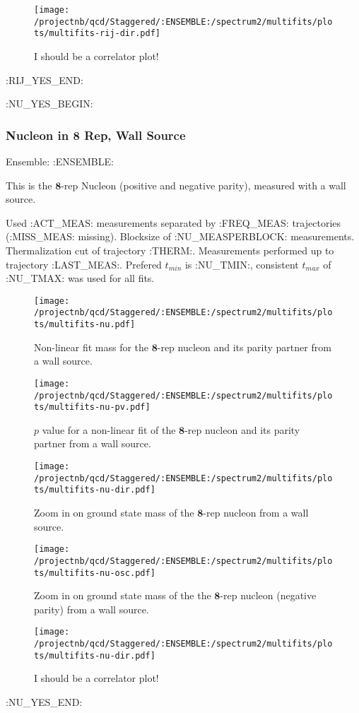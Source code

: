 \begin{figure}[H]
\centering
\texttt{[image: /projectnb/qcd/Staggered/:ENSEMBLE:/spectrum2/multifits/plots/multifits-rij-dir.pdf]}
\caption{I should be a correlator plot!}
\end{figure}

\clearpage
:RIJ_YES_END:

:NU_YES_BEGIN:
\subsubsection{Nucleon in $\mathbf{8}$ Rep, Wall Source}

Ensemble: :ENSEMBLE:

This is the $\mathbf{8}$-rep Nucleon (positive and negative parity), measured with a wall source.

{\small{Used :ACT_MEAS: measurements separated by :FREQ_MEAS: trajectories (:MISS_MEAS: missing). Blocksize of :NU_MEASPERBLOCK: measurements. Thermalization cut of trajectory :THERM:. Measurements performed up to trajectory :LAST_MEAS:. Prefered $t_{min}$ is :NU_TMIN:, consistent $t_{max}$ of :NU_TMAX: was used for all fits.}}

\begin{multicols}{2}
\begin{figure}[H]
\centering
\texttt{[image: /projectnb/qcd/Staggered/:ENSEMBLE:/spectrum2/multifits/plots/multifits-nu.pdf]}
\caption{Non-linear fit mass for the $\mathbf{8}$-rep nucleon and its parity partner from a wall source.}
\end{figure}
\columnbreak
\begin{figure}[H]
\centering
\texttt{[image: /projectnb/qcd/Staggered/:ENSEMBLE:/spectrum2/multifits/plots/multifits-nu-pv.pdf]}
\caption{$p$ value for a non-linear fit of the $\mathbf{8}$-rep nucleon and its parity partner from a wall source.}
\end{figure}
\end{multicols}

\begin{multicols}{2}
\begin{figure}[H]
\centering
\texttt{[image: /projectnb/qcd/Staggered/:ENSEMBLE:/spectrum2/multifits/plots/multifits-nu-dir.pdf]}
\caption{Zoom in on ground state mass of the $\mathbf{8}$-rep nucleon from a wall source.}
\end{figure}
\columnbreak
\begin{figure}[H]
\centering
\texttt{[image: /projectnb/qcd/Staggered/:ENSEMBLE:/spectrum2/multifits/plots/multifits-nu-osc.pdf]}
\caption{Zoom in on ground state mass of the the $\mathbf{8}$-rep nucleon (negative parity) from a wall source.}
\end{figure}
\end{multicols}

\begin{figure}[H]
\centering
\texttt{[image: /projectnb/qcd/Staggered/:ENSEMBLE:/spectrum2/multifits/plots/multifits-nu-dir.pdf]}
\caption{I should be a correlator plot!}
\end{figure}

\clearpage
:NU_YES_END:

